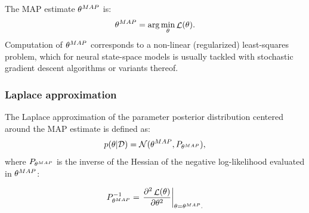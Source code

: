 \documentclass{ifacconf}
\DeclareMathOperator{\nll}{\mathcal{L}}
\newcommand{\N}{\mathcal{N}} %
\newcommand{\MAP}{{\rm MAP}}
\newcommand{\D}{\mathcal{D}} %
\begin{document}
The MAP estimate ${\theta^\MAP}$ is:%
\begin{equation}
  \label{eq:theta_map}
 {\theta^\MAP} = \arg \min_\theta \nll(\theta).
\end{equation}
Computation of $\theta^\MAP$ corresponds to a non-linear (regularized) least-squares problem, which for neural state-space models is usually tackled with
stochastic gradient descent algorithms or variants thereof. 
\subsubsection{Laplace approximation}
The Laplace approximation of the parameter posterior distribution centered around the MAP estimate is defined as:
\begin{equation}
 p(\theta | \D) = \N(\theta^\MAP, P_{\theta^\MAP}),
\end{equation}
where 
$P_{\theta^\MAP}$ is the inverse of the Hessian of 
the {negative }log-likelihood evaluated in $\theta^\MAP$:

\begin{equation}
 P_{\theta^\MAP}^{-1} =  \left .\frac{\partial^2 \nll(\theta)}{\partial \theta^2} \right |_{\theta = {\theta^\MAP} .}
\end{equation}
\end{document}
